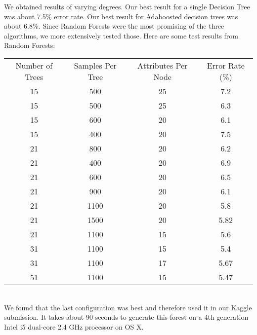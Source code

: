\documentclass[11pt]{article}
\begin{document}
We obtained results of varying degrees. Our best result for a single Decision Tree was about 7.5\% error rate. Our best result for Adaboosted decision trees was about 6.8\%. Since Random Forests were the most promising of the three algorithms, we more extensively tested those. Here are some test results from Random Forests: \\

\begin{tabular}{|c|c|c||c|}
\hline
Number of Trees & Samples Per Tree & Attributes Per Node & Error Rate (\%)\\
15 & 500 & 25 & 7.2 \\
15 & 500 & 25 & 6.3 \\
15 & 600 & 20 & 6.1 \\
15 & 400 & 20 & 7.5 \\
21 & 800 & 20 & 6.2 \\
21 & 400 & 20 & 6.9 \\
21 & 600 & 20 & 6.5 \\
21 & 900 & 20 & 6.1 \\
21 & 1100 & 20 & 5.8 \\
21 & 1500 & 20 & 5.82 \\
21 & 1100 & 15 & 5.6 \\
31 & 1100 & 15 & 5.4 \\
31 & 1100 & 17 & 5.67 \\
51 & 1100 & 15 & 5.47 \\
\hline
\end{tabular}
\vspace{11pt}
\\
We found that the last configuration was best and therefore used it in our Kaggle submission. It takes about 90 seconds to generate this forest on a 4th generation Intel i5 dual-core 2.4 GHz processor on OS X. 
\end{document}
